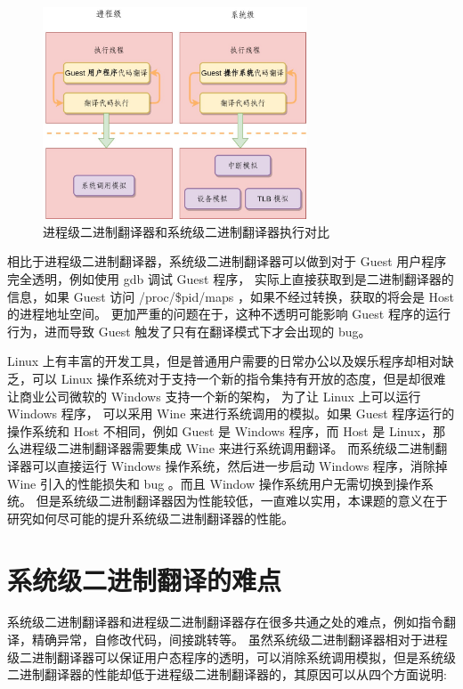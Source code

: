 \begin{figure}[!htbp]
	\centering
	\includegraphics[width=0.7\textwidth]{./images/user-sys-flow.jpg}
	\caption{进程级二进制翻译器和系统级二进制翻译器执行对比}
	\label{fig:user-sys-flow}
\end{figure}

相比于进程级二进制翻译器，系统级二进制翻译器可以做到对于 Guest 用户程序完全透明，例如使用 gdb 调试 Guest 程序，
实际上直接获取到是二进制翻译器的信息，如果 Guest 访问 /proc/\$pid/maps ，如果不经过转换，获取的将会是 Host 的进程地址空间。
更加严重的问题在于，这种不透明可能影响 Guest 程序的运行行为，进而导致 Guest 触发了只有在翻译模式下才会出现的 bug。

Linux 上有丰富的开发工具，但是普通用户需要的日常办公以及娱乐程序却相对缺乏，可以 Linux 操作系统对于支持一个新的指令集持有开放的态度，但是却很难让商业公司微软的 Windows 支持一个新的架构，
为了让 Linux 上可以运行 Windows 程序，
可以采用 Wine \citep{wine} 来进行系统调用的模拟。如果 Guest 程序运行的操作系统和 Host 不相同，例如 Guest 是 Windows 程序，而 Host 是 Linux，那么进程级二进制翻译器需要集成 Wine 来进行系统调用翻译。
而系统级二进制翻译器可以直接运行 Windows 操作系统，然后进一步启动 Windows 程序，消除掉 Wine 引入的性能损失和 bug 。而且 Window 操作系统用户无需切换到操作系统。
但是系统级二进制翻译器因为性能较低，一直难以实用，本课题的意义在于研究如何尽可能的提升系统级二进制翻译器的性能。

\section{系统级二进制翻译的难点}
系统级二进制翻译器和进程级二进制翻译器存在很多共通之处的难点，例如指令翻译，精确异常，自修改代码，间接跳转等。
虽然系统级二进制翻译器相对于进程级二进制翻译器可以保证用户态程序的透明，可以消除系统调用模拟，但是系统级二进制翻译器的性能却低于进程级二进制翻译器的，其原因可以从四个方面说明:

